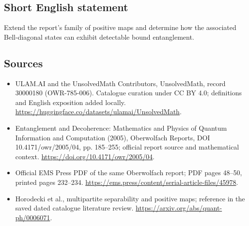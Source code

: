 \documentclass[11pt]{article}
\begin{document}
\subsection{Short English statement}
Extend the report's family of positive maps and determine how the associated Bell-diagonal states can exhibit detectable bound entanglement.
\subsection{Sources}
\begin{itemize}
\item[\hypertarget{source:30000180:1}{S1}] ULAM.AI and the UnsolvedMath Contributors, UnsolvedMath, record 30000180 (OWR-785-006). Catalogue curation under CC BY 4.0; definitions and English exposition added locally.
\url{https://huggingface.co/datasets/ulamai/UnsolvedMath}.
\item[\hypertarget{source:30000180:2}{S2}] Entanglement and Decoherence: Mathematics and Physics of Quantum Information and Computation (2005), Oberwolfach Reports, DOI 10.4171/owr/2005/04, pp. 185--255; official report source and mathematical context.
\url{https://doi.org/10.4171/owr/2005/04}.
\item[\hypertarget{source:30000180:3}{S3}] Official EMS Press PDF of the same Oberwolfach report; PDF pages 48--50, printed pages 232--234.
\url{https://ems.press/content/serial-article-files/45978}.
\item[\hypertarget{source:30000180:4}{S4}] Horodecki et al., multipartite separability and positive maps; reference in the saved dated catalogue literature review.
\url{https://arxiv.org/abs/quant-ph/0006071}.
\end{itemize}
\label{end:30000180}
\end{document}

